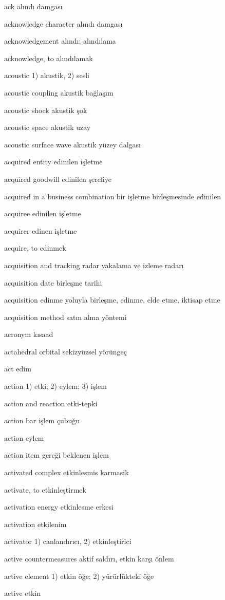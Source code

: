 \documentclass[12pt,fleqn]{article}\usepackage{../../common}
\begin{document}
ack alındı damgası

acknowledge character alındı damgası

acknowledgement alındı; alındılama

acknowledge, to alındılamak

acoustic 1) akustik, 2) sesli

acoustic coupling akustik bağlaşım

acoustic shock akustik şok

acoustic space akustik uzay

acoustic surface wave akustik yüzey dalgası

acquired entity edinilen işletme

acquired goodwill edinilen şerefiye

acquired in a business combination bir işletme birleşmesinde edinilen

acquiree edinilen işletme

acquirer edinen işletme

acquire, to edinmek

acquisition and tracking radar yakalama ve izleme radarı

acquisition date birleşme tarihi

acquisition edinme yoluyla birleşme, edinme, elde etme, iktisap etme

acquisition method satın alma yöntemi

acronym kısaad

actahedral orbital sekizyüzsel yörüngeç

act edim

action 1) etki; 2) eylem; 3) işlem

action and reaction etki-tepki

action bar işlem çubuğu

action eylem

action item gereği beklenen işlem

activated complex etkinlesmis karmasik

activate, to etkinleştirmek

activation energy etkinlesme erkesi

activation etkilenim

activator 1) canlandırıcı, 2) etkinleştirici

active countermeasures aktif saldırı, etkin karşı önlem

active element 1) etkin öğe; 2) yürürlükteki öğe

active etkin
\end{document}
